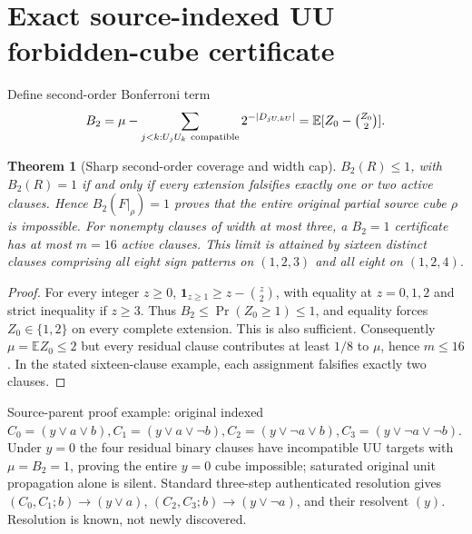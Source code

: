 \documentclass[10pt]{article}
\newtheorem{theorem}{Theorem}
\begin{document}
\section{Exact source-indexed UU forbidden-cube certificate}
Define second-order Bonferroni term
\[
B_2=\mu-\sum_{j<k:U_jU_k\ \mathrm{compatible}}2^{-|D_{jU,kU}|}
=\mathbb E[Z_0-\tbinom{Z_0}{2}].
\]
\begin{theorem}[Sharp second-order coverage and width cap]
$B_2(R)\le1$, with $B_2(R)=1$ if and only if every extension falsifies exactly one or two active clauses. Hence $B_2(F|_\rho)=1$ proves that the entire original partial source cube $\rho$ is impossible. For nonempty clauses of width at most three, a $B_2=1$ certificate has at most $m=16$ active clauses. This limit is attained by sixteen distinct clauses comprising all eight sign patterns on $(1,2,3)$ and all eight on $(1,2,4)$.
\end{theorem}
\begin{proof}
For every integer $z\ge0$, $\mathbf1_{z\ge1}\ge z-\binom z2$, with equality at $z=0,1,2$ and strict inequality if $z\ge3$. Thus $B_2\le\Pr(Z_0\ge1)\le1$, and equality forces $Z_0\in\{1,2\}$ on every complete extension. This is also sufficient. Consequently $\mu=\mathbb EZ_0\le2$ but every residual clause contributes at least $1/8$ to $\mu$, hence $m\le16$. In the stated sixteen-clause example, each assignment falsifies exactly two clauses.
\end{proof}
Source-parent proof example: original indexed
$C_0=(y\vee a\vee b),C_1=(y\vee a\vee\neg b),
C_2=(y\vee\neg a\vee b),C_3=(y\vee\neg a\vee\neg b)$.
Under $y=0$ the four residual binary clauses have incompatible UU targets with $\mu=B_2=1$, proving the entire $y=0$ cube impossible; saturated original unit propagation alone is silent. Standard three-step authenticated resolution gives $(C_0,C_1;b)\to(y\vee a)$, $(C_2,C_3;b)\to(y\vee\neg a)$, and their resolvent $(y)$. Resolution is known, not newly discovered.
\end{document}
